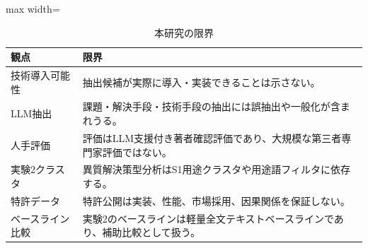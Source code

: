 \begin{table}[tbp]
\centering
\small
\caption{本研究の限界}
\label{tab:limitations_table}
\begin{adjustbox}{max width=\textwidth}
\begin{tabular}{ll}
\toprule
観点 & 限界 \\
\midrule
技術導入可能性 & 抽出候補が実際に導入・実装できることは示さない。 \\
LLM抽出 & 課題・解決手段・技術手段の抽出には誤抽出や一般化が含まれうる。 \\
人手評価 & 評価はLLM支援付き著者確認評価であり、大規模な第三者専門家評価ではない。 \\
実験2クラスタ & 異質解決策型分析はS1用途クラスタや用途語フィルタに依存する。 \\
特許データ & 特許公開は実装、性能、市場採用、因果関係を保証しない。 \\
ベースライン比較 & 実験2のベースラインは軽量全文テキストベースラインであり、補助比較として扱う。 \\
\bottomrule
\end{tabular}
\end{adjustbox}
\end{table}
